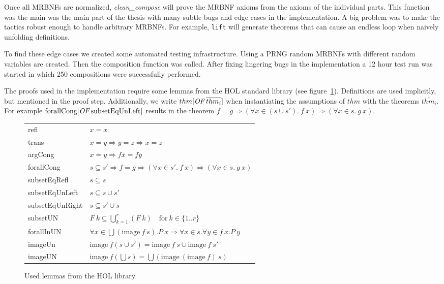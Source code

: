 Once all \acp{MRBNF} are normalized, \textit{clean\_compose} will prove the \ac{MRBNF} axioms from the axioms of the individual parts. This function was the main was the main part of the thesis with many subtle bugs and edge cases in the implementation. A big problem was to make the tactics robust enough to handle arbitrary \acp{MRBNF}. For example, \texttt{lift} will generate theorems that can cause an endless loop when naively unfolding definitions.

To find these edge cases we created some automated testing infrastructure. Using a \ac{PRNG} random \acp{MRBNF} with different random variables are created. Then the composition function was called. After fixing lingering bugs in the implementation a 12 hour test run was started in which 250 compositions were successfully performed.

The proofs used in the implementation require some lemmas from the \ac{HOL} standard library (see figure~\ref{fig:lemmas}). Definitions are used implicitly, but mentioned in the proof step. Additionally, we write $thm[\textit{OF} \: \overline{thm_i}]$ when instantiating the assumptions of $thm$ with the theorems $\overline{thm_i}$. For example $\text{forallCong}[\textit{OF} \: \text{subsetEqUnLeft}]$ results in the theorem $f = g \Longrightarrow (\forall x \in (s \cup s'). \: f \: x) \Longrightarrow (\forall x \in s. \: g \: x)$.

\begin{figure}
\begin{center}
\begin{tabular}{l l}
refl & $x = x$ \\
trans & $x = y \Longrightarrow y = z \Longrightarrow x = z$ \\
argCong & $\overline{x = y} \Longrightarrow f \overline{x} = f \overline{y}$ \\
forallCong & $s \subseteq s' \Longrightarrow f = g \Longrightarrow (\forall x \in s'. \: f \: x) \Longrightarrow (\forall x \in s. \: g \: x)$ \\
subsetEqRefl & $s \subseteq s$ \\
subsetEqUnLeft & $s \subseteq s \cup s'$ \\
subsetEqUnRight & $s \subseteq s' \cup s$ \\
subsetUN & $ F \: k \subseteq \bigcup_{k=1}^{r} \left( F \: k \right) \quad \text{for} \: k \in \{1..r\} $ \\
forallInUN & $ \forall x \in \bigcup \left( \text{image} \: f \: s \right). P \: x \Longrightarrow \forall x \in s. \forall y \in f \: x. P \: y $ \\
imageUn & $\text{image} \: f (s \cup s') = \text{image} \: f \: s \cup \text{image} \: f \: s'$ \\
imageUN & $\text{image} \: f \left( \bigcup s \right) = \bigcup \left( \text{image} \: (\text{image} \: f) \: s \right)$
\end{tabular}
\end{center}
\caption{Used lemmas from the \ac{HOL} library}\label{fig:lemmas}
\end{figure}

